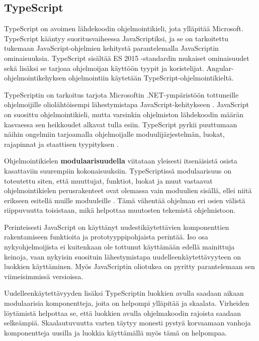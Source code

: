 \documentclass[utf8]{gradu3}
\begin{document}
\subsection{TypeScript}

TypeScript on avoimen lähdekoodin ohjelmointikieli, jota ylläpitää Microsoft. TypeScript kääntyy suoritusvaiheessa JavaScriptiksi, ja se on tarkoitettu tukemaan JavaScript-ohjelmien kehitystä parantelemalla JavaScriptin ominaisuuksia. TypeScript sisältää ES 2015 -standardin mukaiset ominaisuudet sekä lisäksi se tarjoaa ohjelmoijan käyttöön tyypit ja koristelijat. Angular-ohjelmointikehyksen ohjelmointiin käytetään TypeScript-ohjelmointikieltä.

TypeScriptin on tarkoitus tarjota Microsoftin .NET-ympäristöön tottuneille ohjelmoijille oliolähtöisempi lähestymistapa JavaScript-kehitykseen \parencite[]{maharry-typescript}. JavaScript on suosittu ohjelmointikieli, mutta varsinkin ohjelmiston lähdekoodin määrän kasvaessa sen heikkoudet alkavat tulla esiin. TypeScript pyrkii puuttumaan näihin ongelmiin tarjoamalla ohjelmoijalle moduulijärjestelmän, luokat, rajapinnat ja staattisen tyypityksen \parencite[]{understanding-typescript}.

Ohjelmointikielen \textbf{modulaarisuudella} viitataan yleisesti itsenäisistä osista kasattaviin suurempiin kokonaisuuksiin. TypeScriptissä modulaarisuus on toteutettu siten, että muuttujat, funktiot, luokat ja muut vastaavat ohjelmointikielen perusrakenteet ovat olemassa vain moduulien sisällä, ellei niitä erikseen esitellä muille moduuleille \parencite[]{typescript-modules}. Tämä vähentää ohjelman eri osien välistä riippuvuutta toisistaan, mikä helpottaa muutosten tekemistä ohjelmistoon.

Perinteisesti JavaScript on käyttänyt uudestikäytettävien komponenttien rakentamiseen funktioita ja prototyyppipohjaista perintää. Iso osa nykyohjelmoijista ei kuitenkaan ole tottunut käyttämään edellä mainittuja keinoja, vaan nykyisin suosituin lähestymistapa uudelleenkäytettävyyteen on luokkien käyttäminen. Myös JavaScriptin oliotukea on pyritty parantelemaan sen viimeisimmissä versioissa. \parencite[]{typescript-classes}

Uudelleenkäytettävyyden lisäksi TypeScriptin luokkien avulla saadaan aikaan modulaarisia komponentteja, joita on helpompi ylläpitää ja skaalata. Virheiden löytämistä helpottaa se, että luokkien avulla ohjelmakoodin rajoista saadaan selkeämpiä. Skaalautuvuutta varten täytyy monesti pystyä korvaamaan vanhoja komponentteja uusilla ja luokkia käyttämällä myös tämä on helpompaa.
\end{document}
